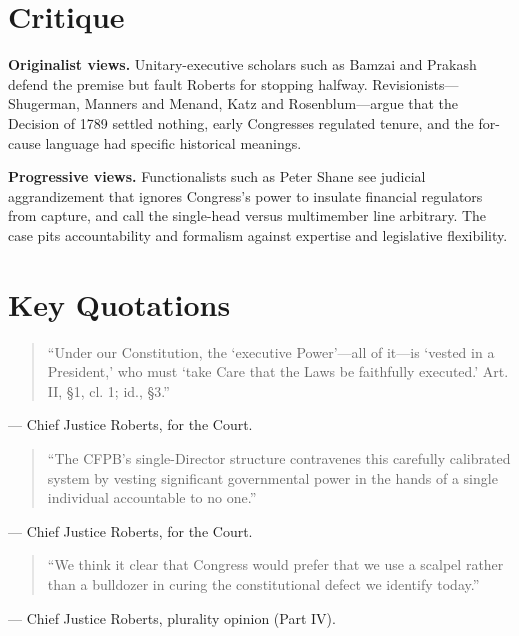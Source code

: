 \documentclass[12pt]{article}
\begin{document}
\section{Critique}

\textbf{Originalist views.} Unitary-executive scholars such as Bamzai and Prakash defend the premise but fault Roberts for stopping halfway. Revisionists---Shugerman, Manners and Menand, Katz and Rosenblum---argue that the Decision of 1789 settled nothing, early Congresses regulated tenure, and the for-cause language had specific historical meanings.

\textbf{Progressive views.} Functionalists such as Peter Shane see judicial aggrandizement that ignores Congress's power to insulate financial regulators from capture, and call the single-head versus multimember line arbitrary. The case pits accountability and formalism against expertise and legislative flexibility.

\section{Key Quotations}

\begin{quote}
``Under our Constitution, the `executive Power'---all of it---is `vested in a President,' who must `take Care that the Laws be faithfully executed.' Art. II, \S 1, cl. 1; id., \S 3.''
\end{quote}
\noindent --- Chief Justice Roberts, for the Court.

\begin{quote}
``The CFPB's single-Director structure contravenes this carefully calibrated system by vesting significant governmental power in the hands of a single individual accountable to no one.''
\end{quote}
\noindent --- Chief Justice Roberts, for the Court.

\begin{quote}
``We think it clear that Congress would prefer that we use a scalpel rather than a bulldozer in curing the constitutional defect we identify today.''
\end{quote}
\noindent --- Chief Justice Roberts, plurality opinion (Part IV).
\end{document}
